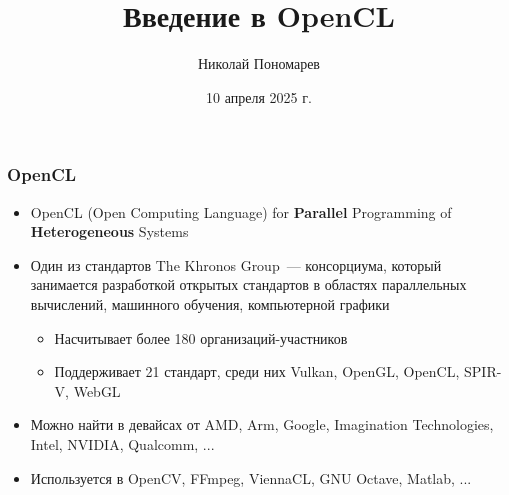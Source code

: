 \documentclass[
    aspectratio=169,
]{beamer}
\title{Введение в OpenCL}
\author{Николай Пономарев}
\institute[Матмех СПбГУ]{Математико-механический факультет СПбГУ}
\date{10 апреля 2025 г.}
\begin{document}
\begin{frame}
    \maketitle
\end{frame}







\begin{frame}
    \frametitle{OpenCL}

    \begin{itemize}
        \item OpenCL (Open Computing Language) for \textbf{Parallel} Programming of \textbf{Heterogeneous} Systems
        \item Один из стандартов The Khronos Group~--- консорциума, который занимается разработкой открытых стандартов в областях параллельных вычислений, машинного обучения, компьютерной графики
              \begin{itemize}
                  \item Насчитывает более 180 организаций-участников
                  \item Поддерживает 21 стандарт, среди них Vulkan, OpenGL, OpenCL, SPIR-V, WebGL
              \end{itemize}
        \item Можно найти в девайсах от AMD, Arm, Google, Imagination Technologies, Intel, NVIDIA, Qualcomm, ...
        \item Используется в OpenCV, FFmpeg, ViennaCL, GNU Octave, Matlab, ...
    \end{itemize}

\end{frame}
\end{document}
